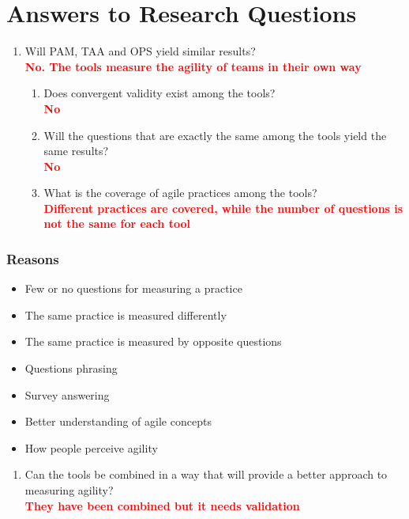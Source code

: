 \section{Answers to Research Questions}

\begin{enumerate}
	\item Will PAM, TAA and OPS yield similar results? \\ \textcolor{red}{\textbf{No. The tools measure the agility of teams in their own way}}
    \setcounter{enumTemp}{\theenumi}
	\begin{enumerate}[label*=\arabic*.]
		\item Does convergent validity exist among the tools? \\ \textcolor{red}{\textbf{No}}
		\item Will the questions that are exactly the same among the tools yield the same results? \\ \textcolor{red}{\textbf{No}}
		\item What is the coverage of agile practices among the tools? \\ \textcolor{red}{\textbf{Different practices are covered, while the number of questions is not the same for each tool}}
	\end{enumerate}
\end{enumerate}

\subsubsection{Reasons}

\begin{itemize}
	\item Few or no questions for measuring a practice
	\item The same practice is measured differently
	\item The same practice is measured by opposite questions
	\item Questions phrasing
	\item Survey answering
	\item Better understanding of agile concepts
	\item How people perceive agility
\end{itemize}

\begin{enumerate}
	\setcounter{enumi}{\theenumTemp}
	\item Can the tools be combined in a way that will provide a better approach to measuring agility? \\ \textcolor{red}{\textbf{They have been combined but it needs validation}}
\end{enumerate}




\clearpage
